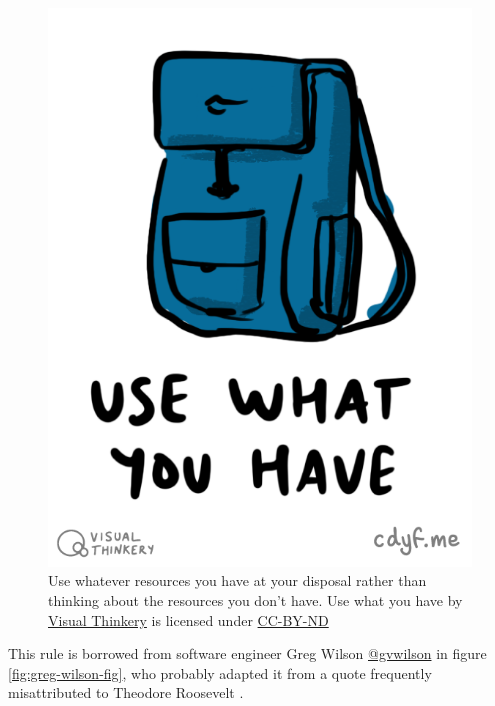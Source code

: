 \documentclass[
]{book}
\begin{document}
\begin{figure}

{\centering \includegraphics[width=0.5\linewidth]{images/Use what you have} 

}

\caption{Use whatever resources you have at your disposal rather than thinking about the resources you don't have. Use what you have by \href{https://visualthinkery.com}{Visual Thinkery} is licensed under \href{https://creativecommons.org/licenses/by-nd/4.0/}{CC-BY-ND}}\label{fig:usewhatyouhave-fig}
\end{figure}



This rule is borrowed from software engineer Greg Wilson \href{https://github.com/gvwilson}{@gvwilson} in figure \ref{fig:greg-wilson-fig}, who probably adapted it from a quote frequently misattributed to Theodore Roosevelt \citep{teddy}.
\end{document}
